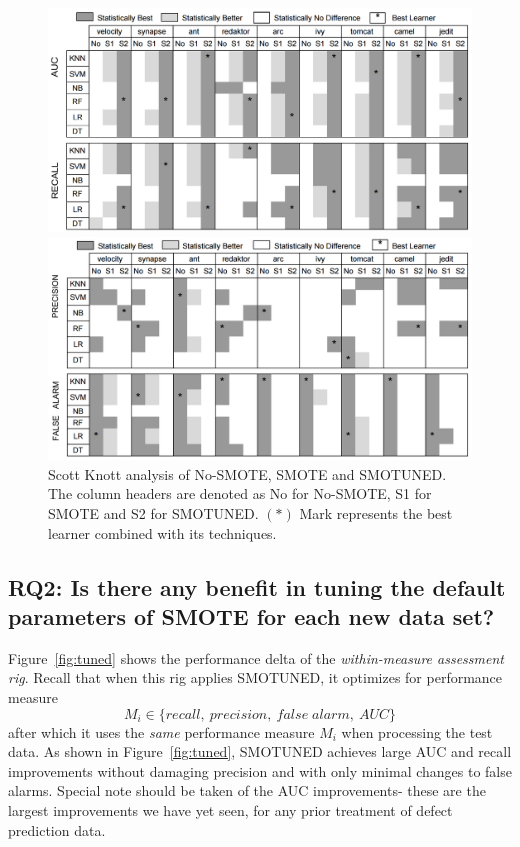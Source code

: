 \documentclass[10pt,conference]{IEEEtran}
\theoremstyle{break}
\theoremstyle{break}
\begin{document}
\begin{figure}[!t]
\begin{minipage}{.5\linewidth}
\centering
        \includegraphics[width=1\linewidth]{./fig/AUC_recall.png}
            \end{minipage}%
\begin{minipage}{.5\linewidth}
        \centering
        \includegraphics[width=1\linewidth]{./fig/prec_pf.png}
    \end{minipage}%
    \caption{Scott Knott analysis of No-SMOTE, SMOTE and SMOTUNED. The column headers are denoted as No for No-SMOTE, S1 for SMOTE and S2 for SMOTUNED. $(\ast)$ Mark represents the best learner combined with its techniques.}
    \label{fig:stats}
\vspace{-0.2cm}
\end{figure}


\subsection {{\bf RQ2}: Is there any benefit in tuning the default parameters of SMOTE for each new data set?}

Figure~\ref{fig:tuned} shows the performance delta of the {\em within-measure assessment rig}.
Recall that when this rig applies SMOTUNED, it optimizes for performance measure
\[M_i \in \{ 
\mathit{recall},
\ \mathit{precision}, 
\ \mathit{false\; alarm},
\ \mathit{AUC}
\}
\]
after which it uses the {\em same} performance measure
$M_i$ when processing the test data.
As shown in Figure~\ref{fig:tuned}, 
SMOTUNED achieves large AUC and recall improvements
without
 damaging precision and  with only minimal changes
 to false alarms. Special note should be taken of the AUC improvements- these are the largest improvements
 we have yet seen, for any prior treatment of defect prediction data.
\end{document}
